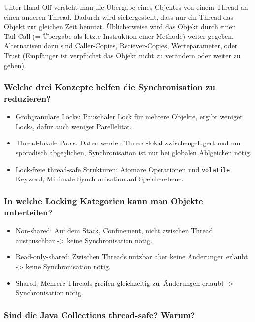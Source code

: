 \documentclass[10pt,a4paper]{scrartcl}
\begin{document}
Unter Hand-Off versteht man die Übergabe eines Objektes von einem Thread an einen anderen Thread.
Dadurch wird sichergestellt, dass nur ein Thread das Objekt zur gleichen Zeit benutzt.
Üblicherweise wird das Objekt durch einen Tail-Call (= Übergabe als letzte Instruktion einer
Methode) weiter gegeben. Alternativen dazu sind Caller-Copies, Reciever-Copies, Werteparameter,
oder Trust (Empfänger ist verpflichet das Objekt nicht zu verändern oder weiter zu geben).
  
\subsubsection{Welche drei Konzepte helfen die Synchronisation zu reduzieren?}

\begin{itemize}
	\item Grobgranulare Locks: Pauschaler Lock für mehrere Objekte, ergibt weniger Locks, dafür auch
		weniger Parellelität.
	\item Thread-lokale Pools: Daten werden Thread-lokal zwischengelagert und nur sporadisch
		abgeglichen, Synchronisation ist nur bei globalen Ablgeichen nötig.
	\item Lock-freie thread-safe Strukturen: Atomare Operationen und \texttt{volatile} Keyword;
		Minimale Synchronisation auf Speicherebene.
\end{itemize}
  
\subsubsection{In welche Locking Kategorien kann man Objekte unterteilen?}
 
\begin{itemize}
	\item Non-shared: Auf dem Stack, Confinement, nicht zwischen Thread austauschbar -> keine Synchronisation nötig.
	\item Read-only-shared: Zwischen Threads nutzbar aber keine Änderungen erlaubt -> keine Synchronisation nötig.
	\item Shared: Mehrere Threads greifen gleichzeitig zu, Änderungen erlaubt -> Synchronisation nötig.
\end{itemize}

\subsubsection{Sind die Java Collections thread-safe? Warum?}
\end{document}
